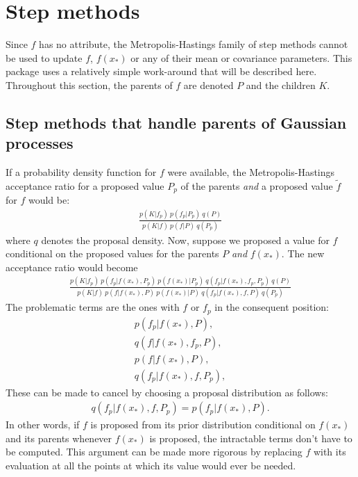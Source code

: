 \section{Step methods}
\label{sec:step-methods}
Since $f$ has no  attribute, the Metropolis-Hastings family of step methods \citep{pymc} cannot be used to update $f$, $f(x_*)$ or any of their mean or covariance parameters. This package uses a relatively simple work-around that will be described here. Throughout this section, the parents of $f$ are denoted $P$ and the children $K$.


\subsection{Step methods that handle parents of Gaussian processes}
If a probability density function for $f$ were available, the Metropolis-Hastings acceptance ratio for a proposed value $P_p$ of the parents \emph{and} a proposed value $\tilde f$ for $f$ would be:
\begin{eqnarray*}
    \frac{p(K|f_p)\ p(f_p|P_p)\ q(P)}{p(K|f)\ p(f|P)\ q(P_p)}
\end{eqnarray*}
where $q$ denotes the proposal density. Now, suppose we proposed a value for $f$ conditional on the proposed values for the parents $P$ \emph{and} $f(x_*)$. The new acceptance ratio would become
\begin{eqnarray*}
    \frac{p(K|f_p)\ p(f_p|f(x_*), P_p)\ p(f(x_*) | P_p)\ q(f_p|f(x_*),f_p, P_p)\ q(P)}{p(K|f)\ p(f|f(x_*), P)\ p(f(x_*) | P)\ q(f_p|f(x_*),f,P)\ q(P_p)}
\end{eqnarray*}
 The problematic terms are the ones with $f$ or $f_p$ in the consequent position:
\begin{eqnarray*}
    p(f_p|f(x_*), P),\\ q(f|f(x_*),f_p,P),\\ p(f|f(x_*), P),\\ q(f_p|f(x_*),f,P_p),
\end{eqnarray*}
These can be made to cancel by choosing a proposal distribution as follows:
\begin{eqnarray*}
    q(f_p|f(x_*),f,P_p) = p(f_p|f(x_*), P).
\end{eqnarray*}
In other words, if $f$ is proposed from its prior distribution conditional on $f(x_*)$ and its parents whenever $f(x_*)$ is proposed, the intractable terms don't have to be computed. This argument can be made more rigorous by replacing $f$ with its evaluation at all the points at which its value would ever be needed.

